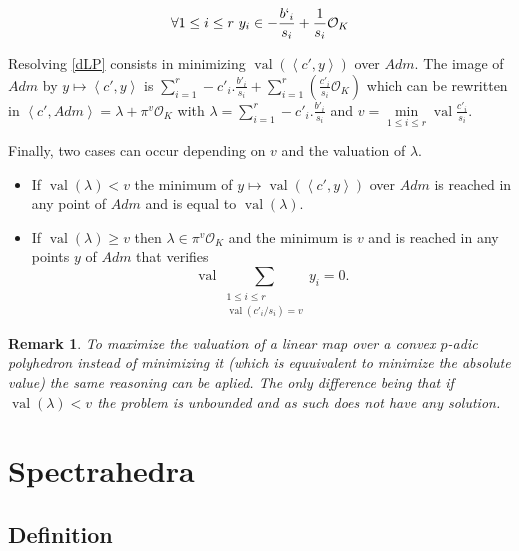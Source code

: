 \documentclass[a4paper,12pt]{article}
\newtheorem{remark}{Remark}
\DeclareMathOperator{\val}{val}
\newcommand{\OK}{\mathcal{O}_K}
\begin{document}
\begin{equation}
	\forall 1 \le i\le r  \ y_i \in -\frac{b`_i}{s_i} + \frac{1}{s_i} \OK
\end{equation}


Resolving \ref{dLP} consists in minimizing $\val\left(\left<c',y \right>\right)$ over $Adm$. The image of $Adm$ by $y \mapsto \left<c',y \right>$ is $\sum_{i=1}^r -c'_i.\frac{b'_i}{s_i} + \sum_{i=1}^r\left( \frac{c'_i}{s_{i}} \OK \right)$ which can be rewritten in $\left<c',Adm \right> = \lambda + \pi^{v} \OK$ with $\lambda = \sum_{i=1}^r -c'_i.\frac{b'_i}{s_i}$ and $v = \min\limits_{1\le i\le r} \val \frac{c'_{i}}{s_{i}} $.

Finally, two cases can occur depending on $v$ and the valuation of $\lambda$.
\begin{itemize}
	\item If $\val( \lambda) < v$ the minimum of $y\mapsto \val\left(\left<c',y \right>\right)$ over $Adm$ is reached in any point of $Adm$ and is equal to $\val\left( \lambda\right)$.
	\item If $\val\left( \lambda \right) \ge v$ then $\lambda \in \pi^{v} \OK$ and the minimum is $v $ and is reached in any points $y$ of $Adm$ that verifies 
	\[\val \underset{ \begin{array}{c} 1\le i\le r\\ \val\left(c'_{i}/{s_{i}} \right) = v  \end{array}}{\sum} y_{i} = 0. \]
	
\end{itemize}
\begin{remark}
	To maximize the valuation of a linear map over a convex $p$-adic polyhedron instead of minimizing it (which is equuivalent to minimize the absolute value) the same reasoning can be aplied. The only difference being that if $\val\left( \lambda\right) < v$ the problem is unbounded and as such does not have any solution. 
\end{remark}




\section{Spectrahedra}

\subsection{Definition}
\newcommand\Mat{Positive semidefinite matrix }
\newcommand\mats{positive semidefinite matrices }
\newcommand\Mats{positive semidefinite matrices }
\end{document}
